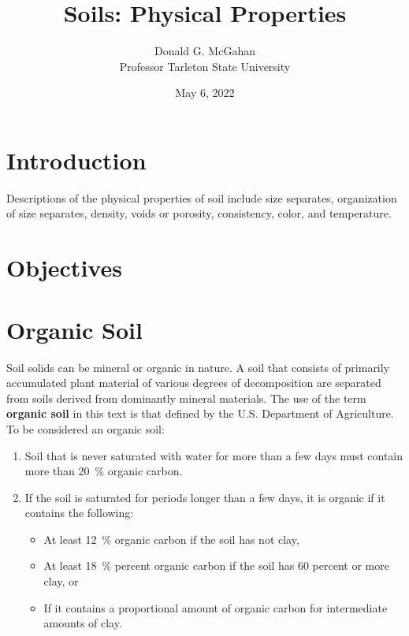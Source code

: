\documentclass[a5paper]{report}
\title{Soils: Physical Properties}
\author{Donald G. McGahan\\ Professor Tarleton State University}
\date{May 6, 2022}
\begin{document}
\maketitle

\section{Introduction}
\label{introduction}

Descriptions of the physical properties of soil include size separates, organization of size separates, density, voids or porosity, consistency, color, and temperature.

\section{Objectives}
\label{objectives}



    
\section{Organic Soil}
\label{organic_soil}
    
Soil solids can be mineral or organic in nature. A soil that consists of primarily accumulated plant material of various degrees of decomposition are separated from soils derived from dominantly mineral materials. The use of the term \textbf{organic soil} in this text is that defined by the U.S. Department of Agriculture. To be considered an organic soil:
    
\begin{enumerate}
    \item Soil that is never saturated with water for more than a few days must contain more than \qty{20}{\percent} organic carbon.
    \item If the soil is saturated for periods longer than a few days, it is organic if it contains the following:
    \begin{itemize}
        \item At least \qty{12}{\percent} organic carbon if the soil has not clay,
        \item At least \qty{18}{\percent} percent organic carbon if the soil has 60 percent or more clay, or
        \item If it contains a proportional amount of organic carbon for intermediate amounts of clay.
    \end{itemize}
\end{enumerate}
    
\end{document}
